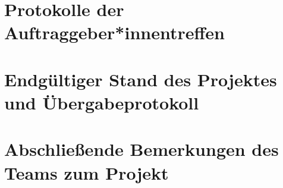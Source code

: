 \documentclass[accentcolor=tud0b,12pt,paper=a4]{tudreport}
\begin{document}











\chapter{Protokolle der Auftraggeber*innentreffen}

















\chapter{Endgültiger Stand des Projektes und Übergabeprotokoll}

\chapter{Abschließende Bemerkungen des Teams zum Projekt}
\end{document}

